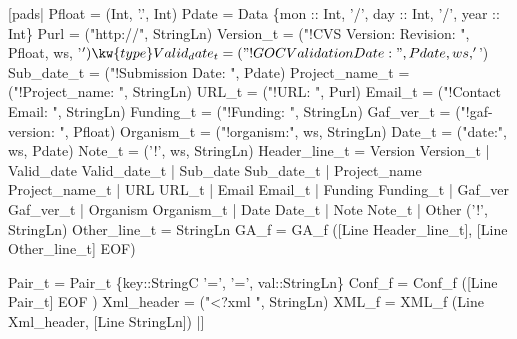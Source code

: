 \begin{code}
[pads|
   Pfloat         = (Int, '.', Int)
   Pdate          = Data \{mon :: Int, '/', day :: Int, '/', year :: Int\}
   Purl           = ("http://", StringLn)
   Version_t      = ("!CVS Version: Revision: ", Pfloat, ws, '$')
  \kw{type} Valid_date_t   = ("!GOC Validation Date: ", Pdate, ws, '$')
   Sub_date_t     = ("!Submission Date: ", Pdate)
   Project_name_t = ("!Project_name: ", StringLn)
   URL_t          = ("!URL: ", Purl)
   Email_t        = ("!Contact Email: ", StringLn)
   Funding_t      = ("!Funding: ", StringLn)
   Gaf_ver_t      = ("!gaf-version: ", Pfloat)
   Organism_t     = ("!organism:", ws, StringLn)
   Date_t         = ("date:", ws, Pdate)
   Note_t         = ('!', ws, StringLn)
\mbox{} 
   Header_line_t = 
          Version Version_t
	| Valid_date Valid_date_t
	| Sub_date Sub_date_t
	| Project_name Project_name_t
	| URL URL_t
	| Email Email_t
	| Funding Funding_t
	| Gaf_ver Gaf_ver_t
	| Organism Organism_t
	| Date Date_t
	| Note Note_t
	| Other ('!', StringLn)
\mbox{} 
   Other_line_t = StringLn
\mbox{} 
   GA_f = GA_f ([Line Header_line_t], [Line Other_line_t]  EOF)

\mbox{} 

   Pair_t = Pair_t \{key::StringC '=', '=', val::StringLn\}
   Conf_f = Conf_f ([Line Pair_t]  EOF )
\mbox{}
   Xml_header = ("<?xml ", StringLn)
   XML_f = XML_f (Line Xml_header, [Line StringLn])
|]
\end{code}

